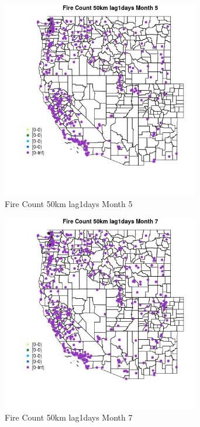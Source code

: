 \begin{figure} 
\centering  
\includegraphics[width=0.77\textwidth]{Code_Outputs/Report_ML_input_PM25_Step4_part_e_de_duplicated_aves_compiled_2019-05-18wNAs_MapObsMo5Fire_Count_50km_lag1days.jpg} 
\caption{\label{fig:Report_ML_input_PM25_Step4_part_e_de_duplicated_aves_compiled_2019-05-18wNAsMapObsMo5Fire_Count_50km_lag1days}Fire Count 50km lag1days Month 5} 
\end{figure} 
 

\begin{figure} 
\centering  
\includegraphics[width=0.77\textwidth]{Code_Outputs/Report_ML_input_PM25_Step4_part_e_de_duplicated_aves_compiled_2019-05-18wNAs_MapObsMo7Fire_Count_50km_lag1days.jpg} 
\caption{\label{fig:Report_ML_input_PM25_Step4_part_e_de_duplicated_aves_compiled_2019-05-18wNAsMapObsMo7Fire_Count_50km_lag1days}Fire Count 50km lag1days Month 7} 
\end{figure} 
 

